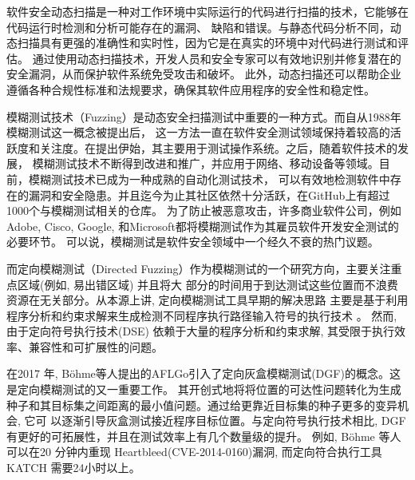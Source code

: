 \documentclass[bachelor]{njupthesis}
\begin{document}
软件安全动态扫描是一种对工作环境中实际运行的代码进行扫描的技术，它能够在代码运行时检测和分析可能存在的漏洞、
缺陷和错误。与静态代码分析不同，动态扫描具有更强的准确性和实时性，因为它是在真实的环境中对代码进行测试和评估。
通过使用动态扫描技术，开发人员和安全专家可以有效地识别并修复潜在的安全漏洞，从而保护软件系统免受攻击和破坏。
此外，动态扫描还可以帮助企业遵循各种合规性标准和法规要求，确保其软件应用程序的安全性和稳定性。

模糊测试技术（Fuzzing）是动态安全扫描测试中重要的一种方式。而自从1988年模糊测试这一概念被提出后，
这一方法一直在软件安全测试领域保持着较高的活跃度和关注度。在提出伊始，其主要用于测试操作系统。之后，随着软件技术的发展，
模糊测试技术不断得到改进和推广，并应用于网络、移动设备等领域。目前，模糊测试技术已成为一种成熟的自动化测试技术，
可以有效地检测软件中存在的漏洞和安全隐患。并且迄今为止其社区依然十分活跃，在GitHub上有超过1000个与模糊测试相关的仓库\cite{manes2019art}。
为了防止被恶意攻击，许多商业软件公司，例如Adobe, Cisco, Google, 和Microsoft都将模糊测试作为其雇员软件开发安全测试的必要环节。
可以说，模糊测试是软件安全领域中一个经久不衰的热门议题。

而定向模糊测试（Directed Fuzzing）作为模糊测试的一个研究方向，主要关注重点区域(例如, 易出错区域) 并且将大
部分的时间用于到达测试这些位置而不浪费资源在无关部分\cite{wang2022}。从本源上讲, 定向模糊测试工具早期的解决思路
主要是基于利用程序分析和约束求解来生成检测不同程序执行路径输入符号的执行技术
\cite{cadar2008klee,ganesh2009taint,ma2011directed,marinescu2013katch,2012BugRedux}。
然而, 由于定向符号执行技术(DSE) 依赖于大量的程序分析和约束求解, 其受限于执行效率、兼容性和可扩展性的问题。

在2017 年, Böhme等人提出的AFLGo\cite{bohmeDGF2017}引入了定向灰盒模糊测试(DGF)的概念。这是定向模糊测试的又一重要工作。
其开创式地将将位置的可达性问题转化为生成种子和其目标集之间距离的最小值问题。通过给更靠近目标集的种子更多的变异机会, 它可
以逐渐引导灰盒测试接近程序目标位置。与定向符号执行技术相比, DGF有更好的可拓展性，并且在测试效率上有几个数量级的提升。
例如, Böhme 等人可以在20 分钟内重现 Heartbleed\cite{Heartbleed}(CVE-2014-0160)漏洞, 而定向符合执行工具
KATCH\cite{marinescu2013katch} 需要24小时以上\cite{bohmeDGF2017}。
\end{document}
